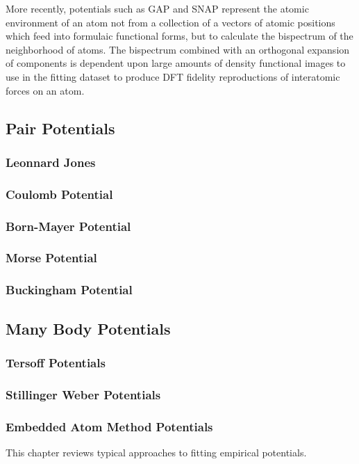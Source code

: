 More recently, potentials such as GAP and SNAP represent the atomic environment of an atom not from a collection of a vectors of atomic positions which feed into formulaic functional forms, but to calculate the bispectrum of the neighborhood of atoms.  The bispectrum combined with an orthogonal expansion of components is dependent upon large amounts of density functional images to use in the fitting dataset to produce DFT fidelity reproductions of interatomic forces on an atom.
\subsection{Pair Potentials}
\subsubsection{Leonnard Jones}
\subsubsection{Coulomb Potential}
\subsubsection{Born-Mayer Potential}
\subsubsection{Morse Potential}
\subsubsection{Buckingham Potential}
\subsection{Many Body Potentials}
\subsubsection{Tersoff Potentials}
\subsubsection{Stillinger Weber Potentials}
\subsubsection{Embedded Atom Method Potentials}
This chapter reviews typical approaches to fitting empirical potentials.
